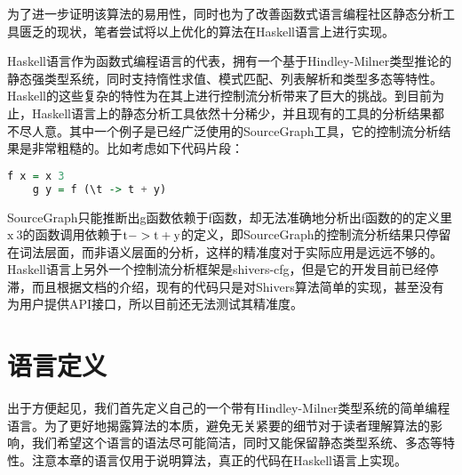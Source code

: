 \documentclass[12pt, titlepage]{article}
\begin{document}
	为了进一步证明该算法的易用性，同时也为了改善函数式语言编程社区静态分析工具匮乏的现状，笔者尝试将以上优化的算法在Haskell语言上进行实现。
	
	Haskell语言作为函数式编程语言的代表，拥有一个基于Hindley-Milner类型推论的静态强类型系统，同时支持惰性求值、模式匹配、列表解析和类型多态等特性。Haskell的这些复杂的特性为在其上进行控制流分析带来了巨大的挑战。到目前为止，Haskell语言上的静态分析工具依然十分稀少，并且现有的工具的分析结果都不尽人意。其中一个例子是已经广泛使用的SourceGraph工具，它的控制流分析结果是非常粗糙的。比如考虑如下代码片段：
	\begin{lstlisting}[language=haskell]
	f x = x 3
	g y = f (\t -> t + y)
	\end{lstlisting}
	SourceGraph只能推断出g函数依赖于f函数，却无法准确地分析出f函数的的定义里$\mathrm{x\ 3}$的函数调用依赖于$\mathrm{\\t -> t + y}$的定义，即SourceGraph的控制流分析结果只停留在词法层面，而非语义层面的分析，这样的精准度对于实际应用是远远不够的。Haskell语言上另外一个控制流分析框架是shivers-cfg，但是它的开发目前已经停滞，而且根据文档的介绍，现有的代码只是对Shivers算法简单的实现，甚至没有为用户提供API接口，所以目前还无法测试其精准度。
	
	\section{语言定义}
	出于方便起见，我们首先定义自己的一个带有Hindley-Milner类型系统的简单编程语言。为了更好地揭露算法的本质，避免无关紧要的细节对于读者理解算法的影响，我们希望这个语言的语法尽可能简洁，同时又能保留静态类型系统、多态等特性。注意本章的语言仅用于说明算法，真正的代码在Haskell语言上实现。
	
\end{document}
